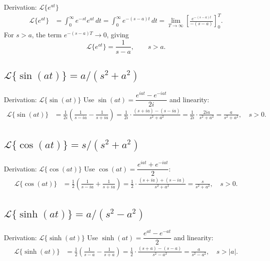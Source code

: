 \documentclass[12pt,a4paper]{article}
\begin{document}
\begin{infobox}{Derivation: $\mathcal{L}\{e^{at}\}$}
\begin{align*}
\mathcal{L}\{e^{at}\}
  &= \int_0^{\infty} e^{-st} e^{at}\,dt
   = \int_0^{\infty} e^{-(s-a)t}\,dt
   = \lim_{T\to\infty}\left[\frac{e^{-(s-a)t}}{-(s-a)}\right]_0^{T}.
\end{align*}
For $s > a$, the term $e^{-(s-a)T} \to 0$, giving
\[
\mathcal{L}\{e^{at}\} = \frac{1}{s-a}, \qquad s > a.
\]
\end{infobox}

\subsection{\texorpdfstring{$\mathcal{L}\{\sin(at)\} = a/(s^2+a^2)$}{L{sin(at)}}}

\begin{infobox}{Derivation: $\mathcal{L}\{\sin(at)\}$}
Use $\sin(at) = \dfrac{e^{iat} - e^{-iat}}{2i}$ and linearity:
\begin{align*}
\mathcal{L}\{\sin(at)\}
  &= \frac{1}{2i}\left(\frac{1}{s-ia} - \frac{1}{s+ia}\right)
   = \frac{1}{2i} \cdot \frac{(s+ia)-(s-ia)}{s^2+a^2}
   = \frac{1}{2i} \cdot \frac{2ia}{s^2+a^2}
   = \frac{a}{s^2+a^2}, \quad s > 0.
\end{align*}
\end{infobox}

\subsection{\texorpdfstring{$\mathcal{L}\{\cos(at)\} = s/(s^2+a^2)$}{L{cos(at)}}}

\begin{infobox}{Derivation: $\mathcal{L}\{\cos(at)\}$}
Use $\cos(at) = \dfrac{e^{iat} + e^{-iat}}{2}$:
\begin{align*}
\mathcal{L}\{\cos(at)\}
  &= \frac{1}{2}\left(\frac{1}{s-ia} + \frac{1}{s+ia}\right)
   = \frac{1}{2} \cdot \frac{(s+ia)+(s-ia)}{s^2+a^2}
   = \frac{s}{s^2+a^2}, \quad s > 0.
\end{align*}
\end{infobox}

\subsection{\texorpdfstring{$\mathcal{L}\{\sinh(at)\} = a/(s^2-a^2)$}{L{sinh(at)}}}

\begin{infobox}{Derivation: $\mathcal{L}\{\sinh(at)\}$}
Use $\sinh(at) = \dfrac{e^{at} - e^{-at}}{2}$ and linearity:
\begin{align*}
\mathcal{L}\{\sinh(at)\}
  &= \frac{1}{2}\left(\frac{1}{s-a} - \frac{1}{s+a}\right)
   = \frac{1}{2}\cdot\frac{(s+a)-(s-a)}{s^2-a^2}
   = \frac{a}{s^2-a^2}, \quad s > |a|.
\end{align*}
\end{infobox}
\end{document}
